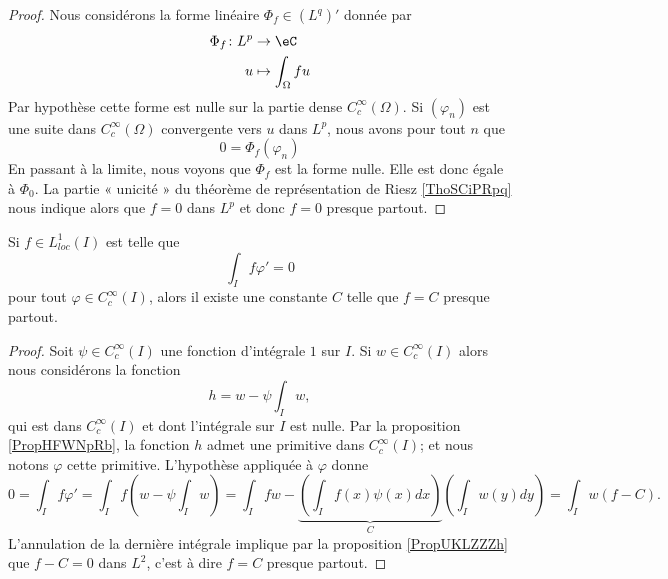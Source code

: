 \begin{proof}
    Nous considérons la forme linéaire \( \Phi_f\in (L^q)'\) donnée par
    \begin{equation}
        \begin{aligned}
            \Phi_f\colon L^p&\to \eC \\
            u&\mapsto \int_{\Omega}fu
        \end{aligned}
    \end{equation}
    Par hypothèse cette forme est nulle sur la partie dense \(  C^{\infty}_c(\Omega)\). Si \( (\varphi_n)\) est une suite dans \(  C^{\infty}_c(\Omega)\) convergente vers \( u\) dans \( L^p\), nous avons pour tout \( n\) que
    \begin{equation}
        0=\Phi_f(\varphi_n)
    \end{equation}
    En passant à la limite, nous voyons que \( \Phi_f\) est la forme nulle. Elle est donc égale à \( \Phi_0\). La partie « unicité » du théorème de représentation de Riesz \ref{ThoSCiPRpq} nous indique alors que \( f=0\) dans \( L^p\) et donc \( f=0\) presque partout.
\end{proof}

\begin{proposition} \label{PropLGoLtcS}
    Si \( f\in L^1_{loc}(I)\) est telle que
    \begin{equation}
        \int_If\varphi'=0
    \end{equation}
    pour tout \( \varphi\in  C^{\infty}_c(I)\), alors il existe une constante \( C\) telle que \( f=C\) presque partout.
\end{proposition}

\begin{proof}
    Soit \( \psi\in C^{\infty}_c(I)\) une fonction d'intégrale \( 1\) sur \( I\). Si \( w\in C^{\infty}_c(I)\) alors nous considérons la fonction
    \begin{equation}
        h=w-\psi\int_Iw,
    \end{equation}
    qui est dans \(  C^{\infty}_c(I)\) et dont l'intégrale sur \( I\) est nulle. Par la proposition \ref{PropHFWNpRb}, la fonction \( h\) admet une primitive dans \(  C^{\infty}_c(I)\); et nous notons \( \varphi\) cette primitive. L'hypothèse appliquée à \( \varphi\) donne
    \begin{equation}
        0=\int_If\varphi'=\int_If\left( w-\psi\int_Iw \right)=\int_Ifw-\underbrace{\left( \int_If(x)\psi(x)dx \right)}_C\left( \int_Iw(y)dy \right)=\int_Iw(f-C).
    \end{equation}
    L'annulation de la dernière intégrale implique par la proposition \ref{PropUKLZZZh} que \( f-C=0\) dans \( L^2\), c'est à dire \( f=C\) presque partout.
\end{proof}

